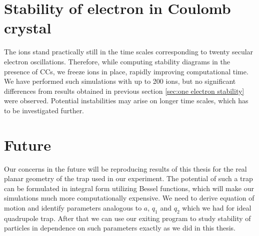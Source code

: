 \section{Stability of electron in Coulomb crystal}
The ions stand practically still in the time scales corresponding to twenty secular electron oscillations. Therefore, while computing stability diagrams in the presence of CCs, we freeze ions in place, rapidly improving computational time. We have performed such simulations with up to 200 ions, but no significant differences from results obtained in previous section \ref{sec:one electron stability} were observed. Potential instabilities may arise on longer time scales, which has to be investigated further.

\section{Future}
Our concerns in the future will be reproducing results of this thesis for the real planar geometry of the trap used in our experiment. The potential of such a trap can be formulated in integral form utilizing Bessel functions, which will make our simulations much more computationally expensive. We need to derive equation of motion and identify parameters analogous to $a$, $q_1$ and $q_2$ which we had for ideal quadrupole trap. After that we can use our exiting program to study stability of particles in dependence on such parameters exactly as we did in this thesis. 